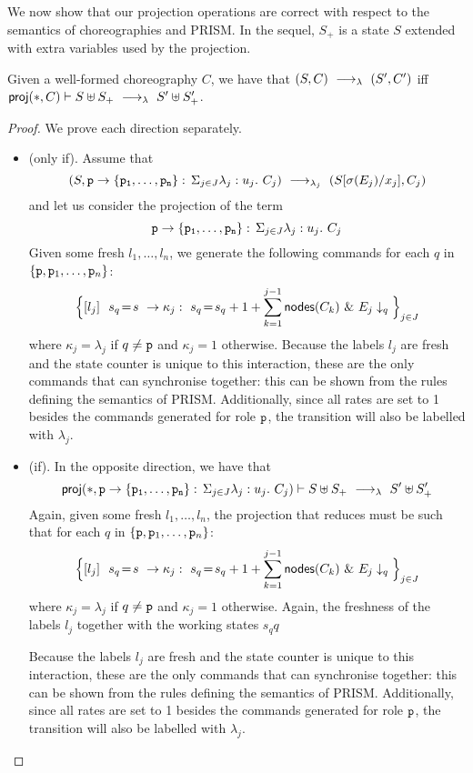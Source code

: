      We now show that our projection operations
    are correct with respect to the semantics of choreographies and
    PRISM. In the sequel, $S_+$ is a state $S$ extended with extra
    variables used by the projection.
      \begin{theorem}[EPP]\label{thm:epp}
        Given a well-formed choreography $C$, we have that
        $(S,C) \ \longrightarrow_{\lambda}\  (S', C')$ iff
        $\mathsf{proj} (*, C)\vdash S\uplus S_{+}\ \longrightarrow_{\lambda}\  S'\uplus S_{+}'$.
      \end{theorem} 
      \begin{proof} We prove each direction separately.
        \begin{itemize}
        \item (only if). Assume that
    $$(S, \mathtt{p}\rightarrow \{\mathtt{\mathtt{p}_1,\ldots,\mathtt{p}_n}\}:\,\Sigma_{j\in J}\lambda_j: u_j.\ C_j)\ \longrightarrow_{\lambda_j}\ (S[\sigma(E_j)/x_j], C_j)$$
    and let us consider the projection of the term
    $$\mathtt{p}\rightarrow \{\mathtt{\mathtt{p}_1,\ldots,\mathtt{p}_n}\}:\,\Sigma_{j\in J}\lambda_j: u_j.\ C_j$$
    Given some fresh $l_1,\ldots, l_n$, we generate the following
    commands for each $q$ in
    $\{\mathtt{p}, \mathtt{p}_1,\ldots,\mathtt{p}_n\}$:
    $$
    \Big\{\commandBase {l_j} {\ s_{q}\!=\! s} {\kappa_j:\ s_{q}\!=\!
      s_{q} +1+\sum_{k=1}^{j-1}\mathsf{nodes}({C_k})}\ \&\ \projE
    {E_j}q\Big\}_{j\in J}
    $$
    where $\kappa_j=\lambda_j$ if $q\neq\mathtt{p}$ and $\kappa_j=1$
    otherwise. 
    Because the labels $l_j$ are fresh and the state counter is unique
    to this interaction, these are the only commands that can
    synchronise together: this can be shown from the rules defining
    the semantics of PRISM. Additionally, since all rates are set to 1
    besides the commands generated for role $\mathtt{p}$, the transition
    will also be labelled with $\lambda_j$.


  \item (if). In the opposite direction, we have that 
    $$\mathsf{proj} (*, \mathtt{p}\rightarrow \{\mathtt{\mathtt{p}_1,\ldots,\mathtt{p}_n}\}:\,\Sigma_{j\in J}\lambda_j: u_j.\ C_j)\vdash
    S\uplus S_{+}\ \longrightarrow_{\lambda}\  S'\uplus S_{+}'$$
    Again, given some fresh $l_1,\ldots, l_n$, the projection that
    reduces must be such that for each $q$ in
    $\{\mathtt{p}, \mathtt{p}_1,\ldots,\mathtt{p}_n\}$:
    $$
    \Big\{\commandBase {l_j} {\ s_{q}\!=\! s} {\kappa_j:\ s_{q}\!=\!
      s_{q} +1+\sum_{k=1}^{j-1}\mathsf{nodes}({C_k})}\ \&\ \projE
    {E_j}q\Big\}_{j\in J}
    $$
    where $\kappa_j=\lambda_j$ if $q\neq\mathtt{p}$ and $\kappa_j=1$
    otherwise. 
    Again, the freshness of the labels $l_j$ together with the working
    states $s_qq$

    Because the labels $l_j$ are fresh and the state counter is unique
    to this interaction, these are the only commands that can
    synchronise together: this can be shown from the rules defining
    the semantics of PRISM. Additionally, since all rates are set to 1
    besides the commands generated for role $\mathtt{p}$, the transition
    will also be labelled with $\lambda_j$.

  \end{itemize}
\end{proof}

